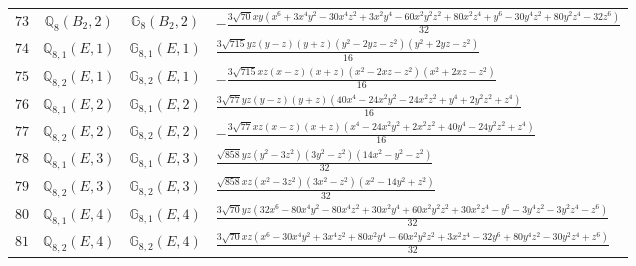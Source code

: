 \documentclass[fleqn,8pt,landscape]{jsarticle}
\begin{document}
\begin{table}[ht!]
\begin{center}
\begin{tabular}{cccl}
$ 73 $ & $ \mathbb{Q}_{8}(B_{2},2) $ & $ \mathbb{G}_{8}(B_{2},2) $ & $ - \frac{3 \sqrt{70} x y \left(x^{6} + 3 x^{4} y^{2} - 30 x^{4} z^{2} + 3 x^{2} y^{4} - 60 x^{2} y^{2} z^{2} + 80 x^{2} z^{4} + y^{6} - 30 y^{4} z^{2} + 80 y^{2} z^{4} - 32 z^{6}\right)}{32} $ \\
$ 74 $ & $ \mathbb{Q}_{8,1}(E,1) $ & $ \mathbb{G}_{8,1}(E,1) $ & $ \frac{3 \sqrt{715} y z \left(y - z\right) \left(y + z\right) \left(y^{2} - 2 y z - z^{2}\right) \left(y^{2} + 2 y z - z^{2}\right)}{16} $ \\
$ 75 $ & $ \mathbb{Q}_{8,2}(E,1) $ & $ \mathbb{G}_{8,2}(E,1) $ & $ - \frac{3 \sqrt{715} x z \left(x - z\right) \left(x + z\right) \left(x^{2} - 2 x z - z^{2}\right) \left(x^{2} + 2 x z - z^{2}\right)}{16} $ \\
$ 76 $ & $ \mathbb{Q}_{8,1}(E,2) $ & $ \mathbb{G}_{8,1}(E,2) $ & $ \frac{3 \sqrt{77} y z \left(y - z\right) \left(y + z\right) \left(40 x^{4} - 24 x^{2} y^{2} - 24 x^{2} z^{2} + y^{4} + 2 y^{2} z^{2} + z^{4}\right)}{16} $ \\
$ 77 $ & $ \mathbb{Q}_{8,2}(E,2) $ & $ \mathbb{G}_{8,2}(E,2) $ & $ - \frac{3 \sqrt{77} x z \left(x - z\right) \left(x + z\right) \left(x^{4} - 24 x^{2} y^{2} + 2 x^{2} z^{2} + 40 y^{4} - 24 y^{2} z^{2} + z^{4}\right)}{16} $ \\
$ 78 $ & $ \mathbb{Q}_{8,1}(E,3) $ & $ \mathbb{G}_{8,1}(E,3) $ & $ \frac{\sqrt{858} y z \left(y^{2} - 3 z^{2}\right) \left(3 y^{2} - z^{2}\right) \left(14 x^{2} - y^{2} - z^{2}\right)}{32} $ \\
$ 79 $ & $ \mathbb{Q}_{8,2}(E,3) $ & $ \mathbb{G}_{8,2}(E,3) $ & $ \frac{\sqrt{858} x z \left(x^{2} - 3 z^{2}\right) \left(3 x^{2} - z^{2}\right) \left(x^{2} - 14 y^{2} + z^{2}\right)}{32} $ \\
$ 80 $ & $ \mathbb{Q}_{8,1}(E,4) $ & $ \mathbb{G}_{8,1}(E,4) $ & $ \frac{3 \sqrt{70} y z \left(32 x^{6} - 80 x^{4} y^{2} - 80 x^{4} z^{2} + 30 x^{2} y^{4} + 60 x^{2} y^{2} z^{2} + 30 x^{2} z^{4} - y^{6} - 3 y^{4} z^{2} - 3 y^{2} z^{4} - z^{6}\right)}{32} $ \\
$ 81 $ & $ \mathbb{Q}_{8,2}(E,4) $ & $ \mathbb{G}_{8,2}(E,4) $ & $ \frac{3 \sqrt{70} x z \left(x^{6} - 30 x^{4} y^{2} + 3 x^{4} z^{2} + 80 x^{2} y^{4} - 60 x^{2} y^{2} z^{2} + 3 x^{2} z^{4} - 32 y^{6} + 80 y^{4} z^{2} - 30 y^{2} z^{4} + z^{6}\right)}{32} $ \\
 \hline \hline
\end{tabular}
\end{center}
\end{table}
\end{document}
